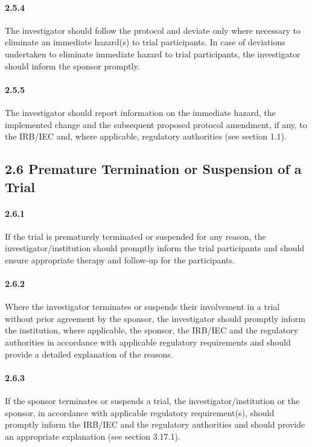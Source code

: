 \documentclass[11pt]{article}
\begin{document}
\paragraph{2.5.4} The investigator should follow the protocol and deviate only where necessary to eliminate an immediate hazard(s) to trial participants. In case of deviations undertaken to eliminate immediate hazard to trial participants, the investigator should inform the sponsor promptly.

\paragraph{2.5.5} The investigator should report information on the immediate hazard, the implemented change and the subsequent proposed protocol amendment, if any, to the IRB/IEC and, where applicable, regulatory authorities (see section 1.1).

\subsection{2.6 Premature Termination or Suspension of a Trial}

\paragraph{2.6.1} If the trial is prematurely terminated or suspended for any reason, the investigator/institution should promptly inform the trial participants and should ensure appropriate therapy and follow-up for the participants.

\paragraph{2.6.2} Where the investigator terminates or suspends their involvement in a trial without prior agreement by the sponsor, the investigator should promptly inform the institution, where applicable, the sponsor, the IRB/IEC and the regulatory authorities in accordance with applicable regulatory requirements and should provide a detailed explanation of the reasons.

\paragraph{2.6.3} If the sponsor terminates or suspends a trial, the investigator/institution or the sponsor, in accordance with applicable regulatory requirement(s), should promptly inform the IRB/IEC and the regulatory authorities and should provide an appropriate explanation (see section 3.17.1).
\end{document}
